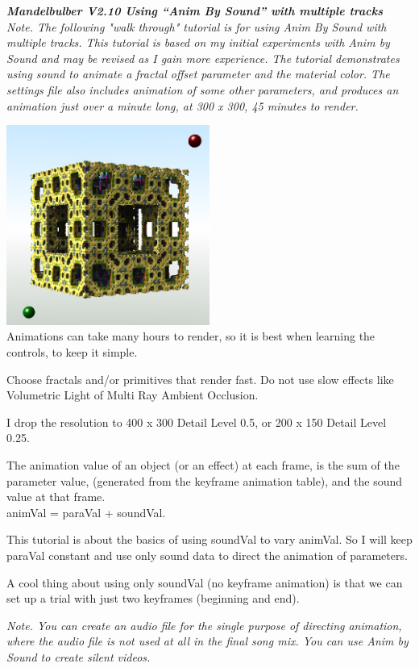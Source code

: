 \emph{\emph{\textbf{Mandelbulber V2.10 Using ``Anim By Sound'' with
multiple tracks}\\[2\baselineskip]Note. The following "walk through"
tutorial is for using Anim By Sound with multiple tracks. This tutorial
is based on my initial experiments with Anim by Sound and may be revised
as I gain more experience. The tutorial demonstrates using sound to
animate a fractal offset parameter and the material color. The settings
file also includes animation of some other parameters, and produces an
animation just over a minute long, at 300 x 300, 45 minutes to render.}}

\includegraphics[width=2.62559in,height=2.58071in]{img/sound/media/image1.png}\\
Animations can take many hours to render, so it is best when learning
the controls, to keep it simple.

Choose fractals and/or primitives that render fast. Do not use slow
effects like Volumetric Light of Multi Ray Ambient Occlusion.

I drop the resolution to 400 x 300 Detail Level 0.5, or 200 x 150 Detail
Level 0.25.

The animation value of an object (or an effect) at each frame, is the
sum of the parameter value, (generated from the keyframe animation
table), and the sound value at that frame.\\[2\baselineskip]animVal =
paraVal + soundVal.

This tutorial is about the basics of using soundVal to vary animVal. So
I will keep paraVal constant and use only sound data to direct the
animation of parameters.

A cool thing about using only soundVal (no keyframe animation) is that
we can set up a trial with just two keyframes (beginning and end).

\emph{Note. You can create an audio file for the single purpose of
directing animation, where the audio file is not used at all in the
final song mix. You can use Anim by Sound to create silent videos.}

